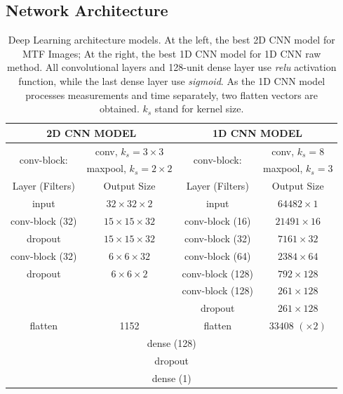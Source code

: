 \subsection{Network Architecture}

\begin{table}[!t]
\centering
\caption{Deep Learning architecture models. At the left, the best 2D CNN model for MTF Images; At the right, the best 1D CNN model for 1D CNN raw method. All convolutional layers and 128-unit dense layer use \textit{relu} activation function, while the last dense layer use \textit{sigmoid}. As the 1D CNN model processes measurements and time separately, two flatten vectors are obtained. $k_s$ stand for kernel size. \vspace{0.1cm}}
\label{tab:model:arch}
\begin{tabular}{|cc|cc|} \hline
\multicolumn{2}{|c|}{\textbf{2D CNN MODEL}}    &    \multicolumn{2}{c|}{\textbf{1D CNN MODEL}}  \\ \hline
\multirow{2}{*}{conv-block:} &  conv, $k_s=3\times 3$   &    \multirow{2}{*}{conv-block:} &  conv, $k_s=8$ \\
& maxpool, $k_s=2\times 2$    &    & maxpool, $k_s=3$  \\
\hline \hline
Layer (Filters)   &  Output Size    & Layer (Filters) &  Output Size \\ \hline
input &   $32 \times 32 \times 2$ &   input  &  $64482 \times 1$ \\ %
conv-block (32) &  $15 \times 15 \times 32$ & conv-block (16)  &  $21491 \times 16$ \\
dropout  & $15 \times 15 \times 32$ &     conv-block (32)   &  $7161\times 32$   \\
conv-block (32) &  $6 \times 6 \times 32$ &   conv-block (64)  & $2384\times 64$  \\
dropout  &  $6 \times 6 \times 2$   &   conv-block (128) & $792\times 128$ \\
& & conv-block (128) & $261\times 128$ \\
& & dropout  & $261\times 128$ \\ \hline
flatten    & 1152    &  flatten     &    $33408$  $(\times 2)$   \\ \hline
\multicolumn{4}{|c|}{dense (128)} \\
\multicolumn{4}{|c|}{dropout} \\
\multicolumn{4}{|c|}{dense (1)} \\ \hline
\end{tabular}
\end{table}
